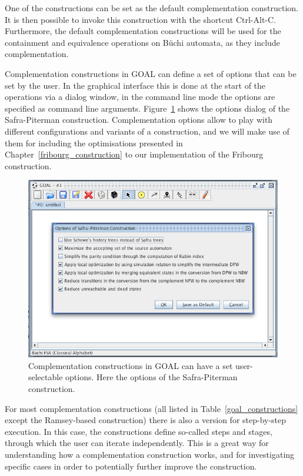 One of the constructions can be set as the default complementation construction. It is then possible to invoke this construction with the shortcut Ctrl-Alt-C. Furthermore, the default complementation constructions will be used for the containment and equivalence operations on Büchi automata, as they include complementation.

Complementation constructions in GOAL can define a set of options that can be set by the user. In the graphical interface this is done at the start of the operations via a dialog window, in the command line mode the options are specified as command line arguments. Figure~\ref{goal_complementation_options} shows the options dialog of the Safra-Piterman construction. Complementation options allow to play with different configurations and variants of a construction, and we will make use of them for including the optimisations presented in Chapter~\ref{fribourg_construction} to our implementation of the Fribourg construction.


\begin{figure}
\begin{center}
\includegraphics[scale=0.5]{figures/goal_complementation_options.png}
\caption{Complementation constructions in GOAL can have a set user-selectable options. Here the options of the Safra-Piterman construction.}
\label{goal_complementation_options}
\end{center}
\end{figure}

For most complementation constructions (all listed in Table~\ref{goal_constructions} except the Ramsey-based construction) there is also a version for step-by-step execution. In this case, the constructions define so-called steps and stages, through which the user can iterate independently. This is a great way for understanding how a complementation construction works, and for investigating specific cases in order to potentially further improve the construction. 


